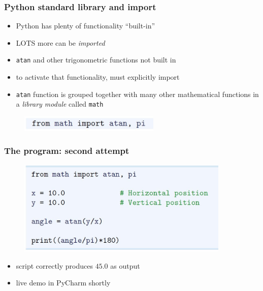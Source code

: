\documentclass[14pt]{beamer}
\newcommand\red[1]{{\color{red} #1}}
\begin{document}

\begin{frame}[fragile]
\frametitle{Python standard library and import}
\begin{itemize}
\item Python has plenty of functionality ``built-in''
\item LOTS more can be \red{\emph{imported}}
\item \texttt{atan} and other trigonometric functions not built in
\item to activate that functionality, must explicitly import
\item \texttt{atan} function is grouped together with many other mathematical functions in a \red{\emph{library module}}  called \texttt{math}
\end{itemize}

\begin{figure}[ht]
	\centering
	\includegraphics[width=0.6\textwidth]{figures/LLp13a}
\end{figure}


\end{frame}


\begin{frame}[fragile]
\frametitle{The program: second attempt}

\begin{figure}[ht]
	\centering
	\includegraphics[width=0.9\textwidth]{figures/LLp13b}
\end{figure}
\begin{itemize}
\item script correctly produces $45.0$ as output
\item live demo in PyCharm shortly
\end{itemize}

\end{frame}
\end{document}
